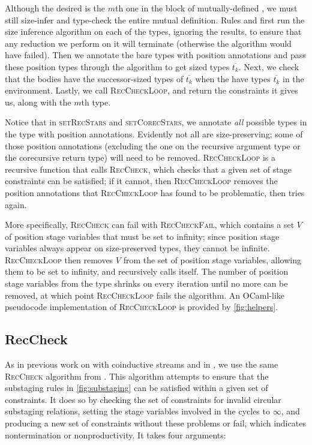 \documentclass[acmsmall,nonacm,screen,review,anonymous,10pt]{acmart}
\begin{document}
Although the desired \cofixpoint is the $m$th one in the block of mutually-defined \cofixpoints, we must still size-infer and type-check the entire mutual definition. Rules  and  first run the size inference algorithm on each of the \cofixpoint types, ignoring the results, to ensure that any reduction we perform on it will terminate (otherwise the algorithm would have failed). Then we annotate the bare types with position annotations and pass these position types through the algorithm to get sized types $\overline{t_k}$. Next, we check that the \cofixpoint bodies have the successor-sized types of $\overline{t_k}$ when the \cofixpoints have types $\overline{t_k}$ in the environment. Lastly, we call \textsc{RecCheckLoop}, and return the constraints it gives us, along with the $m$th \cofixpoint type.



Notice that in \textsc{setRecStars} and \textsc{setCorecStars}, we annotate \textit{all} possible \coinductive types in the \cofixpoint type with position annotations. Evidently not all \cofixpoints are size-preserving; some of those position annotations (excluding the one on the recursive argument type or the corecursive return type) will need to be removed. \textsc{RecCheckLoop} is a recursive function that calls \textsc{RecCheck}, which checks that a given set of stage constraints can be satisfied; if it cannot, then \textsc{RecCheckLoop} removes the position annotations that \textsc{RecCheckLoop} has found to be problematic, then tries again. 

More specifically, \textsc{RecCheck} can fail with \textsc{RecCheckFail}, which contains a set $V$ of position stage variables that must be set to infinity; since position stage variables always appear on size-preserved types, they cannot be infinite. \textsc{RecCheckLoop} then removes $V$ from the set of position stage variables, allowing them to be set to infinity, and recursively calls itself. The number of position stage variables from the \cofixpoint type shrinks on every iteration until no more can be removed, at which point \textsc{RecCheckLoop} fails the algorithm. An OCaml-like pseudocode implementation of \textsc{RecCheckLoop} is provided by \autoref{fig:helpers}.

\subsection{RecCheck}

As in previous work on \CChatomega with coinductive streams \cite{cc-hat-omega} and in \CIChat, we use the same \textsc{RecCheck} algorithm from \Fhat \cite{f-hat}. This algorithm attempts to ensure that the substaging rules in \autoref{fig:substaging} can be satisfied within a given set of constraints. It does so by checking the set of constraints for invalid circular substaging relations, setting the stage variables involved in the cycles to $\infty$, and producing a new set of constraints without these problems or fail, which indicates nontermination or nonproductivity. It takes four arguments:
\end{document}
